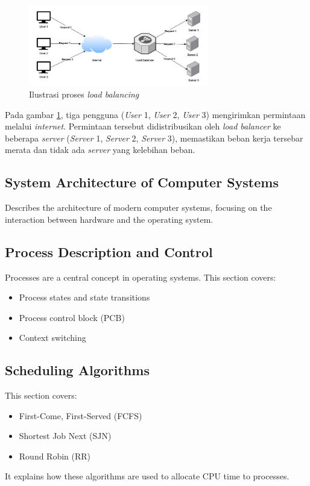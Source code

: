 \documentclass[12pt]{article}
\begin{document}
\begin{enumerate}
\begin{enumerate}
\begin{figure}[h]
            \centering
            \includegraphics[width=0.7\textwidth] {asset/proses_load_balancing.jpg} 
            \caption{Ilustrasi proses \textit{load balancing}}
            \label{fig:proses_load_balancing}
        \end{figure}
        \par Pada gambar \ref{fig:proses_load_balancing}, tiga pengguna (\textit{User} 1, \textit{User} 2, \textit{User} 3) mengirimkan permintaan melalui \textit{internet}. Permintaan tersebut didistribusikan oleh \textit{load balancer} ke beberapa \textit{server} (\textit{Server} 1, \textit{Server} 2, \textit{Server} 3), memastikan beban kerja tersebar merata dan tidak ada \textit{server} yang kelebihan beban.
    \end{enumerate}
\end{enumerate}

\subsection{System Architecture of Computer Systems}
Describes the architecture of modern computer systems, focusing on the interaction between hardware and the operating system.

\subsection{Process Description and Control}
Processes are a central concept in operating systems. This section covers:
\begin{itemize}
    \item Process states and state transitions
    \item Process control block (PCB)
    \item Context switching
\end{itemize}

\subsection{Scheduling Algorithms}
This section covers:
\begin{itemize}
    \item First-Come, First-Served (FCFS)
    \item Shortest Job Next (SJN)
    \item Round Robin (RR)
\end{itemize}
It explains how these algorithms are used to allocate CPU time to processes.
\end{document}
